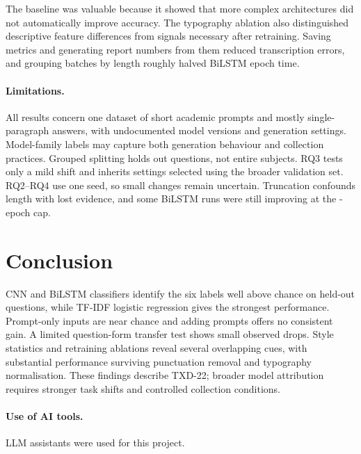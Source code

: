 \documentclass[11pt]{article}
\begin{document}
The baseline was valuable because it showed that more complex architectures did not automatically improve
accuracy. The typography ablation also distinguished descriptive feature differences from signals necessary
after retraining. Saving metrics and generating report numbers from them reduced transcription errors,
and grouping batches by length roughly halved BiLSTM epoch time.

\paragraph{Limitations.} All results concern one dataset of short academic prompts and mostly single-paragraph
answers, with undocumented model versions and generation settings. Model-family labels may capture both
generation behaviour and collection practices. Grouped splitting holds out questions, not entire subjects.
RQ3 tests only a mild shift and inherits settings selected using the broader validation set. RQ2--RQ4 use
one seed, so small changes remain uncertain. Truncation confounds length with lost evidence, and some
BiLSTM runs were still improving at the \MaxEpochs-epoch cap.

\section{Conclusion}
CNN and BiLSTM classifiers identify the six labels well above chance on held-out questions, while TF-IDF
logistic regression gives the strongest performance. Prompt-only inputs are near chance and adding prompts
offers no consistent gain. A limited question-form transfer test shows small observed drops. Style statistics
and retraining ablations reveal several overlapping cues, with substantial performance surviving punctuation
removal and typography normalisation. These findings describe TXD-22; broader model attribution requires
stronger task shifts and controlled collection conditions.

\paragraph{Use of AI tools.} LLM assistants were used for this project.
\end{document}
